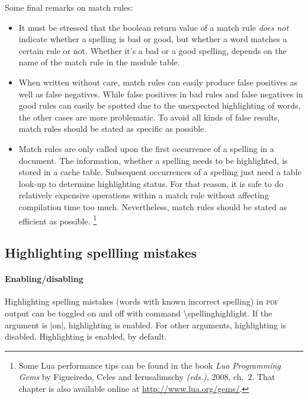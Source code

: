 \documentclass[11pt]{article}
\newcommand*{\acr}[1]{\mbox{\scshape#1}}
\newcommand*{\cmd}[1]{\mbox{\ttfamily\textbackslash#1}}
\newcommand*{\macro}[1]{\cmd{#1}\marginpar{\cmd{#1}}}
\begin{document}
Some final remarks on match rules:

\begin{itemize}

\item It must be stressed that the boolean return value of a match rule
  \emph{does not} indicate whether a spelling is bad or good, but
  whether a word matches a certain rule or not.  Whether it's a bad or a
  good spelling, depends on the name of the match rule in the module
  table.

\item When written without care, match rules can easily produce false
  positives as well as false negatives.  While false positives in bad
  rules and false negatives in good rules can easily be spotted due to
  the unexpected highlighting of words, the other cases are more
  problematic.  To avoid all kinds of false results, match rules should
  be stated as specific as possible.

\item Match rules are only called upon the first occurrence of a
  spelling in a document.  The information, whether a spelling needs to
  be highlighted, is stored in a cache table.  Subsequent occurrences of
  a spelling just need a table look-up to determine highlighting status.
  For that reason, it is safe to do relatively expensive operations
  within a match rule without affecting compilation time too much.
  Nevertheless, match rules should be stated as efficient as possible.%
  \footnote{Some Lua performance tips can be found in the book \emph{Lua
      Programming Gems} by Figueiredo, Celes and Ierusalimschy
    \emph{(eds.)}, 2008, ch.~2.  That chapter is also available online
    at \url{http://www.lua.org/gems/}.}

\end{itemize}


\subsection{Highlighting spellling mistakes}
\label{sec:highlight}

\paragraph{Enabling/disabling} Highlighting spelling mistakes (words
with known incorrect spelling) in \acr{pdf} output can be toggled on and
off with command \macro{spellinghighlight}.  If the argument is |on|,
highlighting is enabled.  For other arguments, highlighting is disabled.
Highlighting is enabled, by default.
\end{document}
